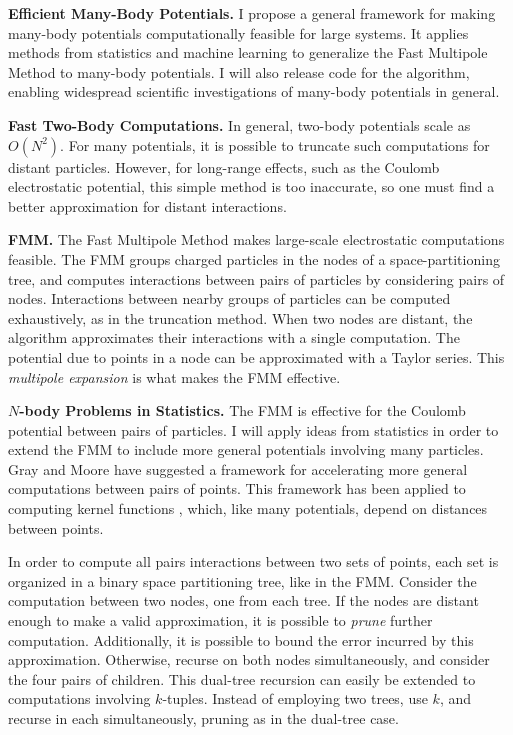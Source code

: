 \documentclass[twoside,leqno, 12pt]{article}
\begin{document}
\textbf{Efficient Many-Body Potentials.}  I propose a general framework for making many-body potentials computationally feasible for large systems.  It applies methods from statistics and machine learning to generalize the Fast Multipole Method to many-body potentials.  I will also release code for the algorithm, enabling widespread scientific investigations of many-body potentials in general.


\textbf{Fast Two-Body Computations.}  In general, two-body potentials scale as $O(N^2)$.  For many potentials, it is possible to truncate such computations for distant particles.  However, for long-range effects, such as the Coulomb electrostatic potential, this simple method is too inaccurate, so one must find a better approximation for distant interactions.  

\textbf{FMM.}  The Fast Multipole Method \cite{grngard} makes large-scale electrostatic computations feasible.  The FMM groups charged particles in the nodes of a space-partitioning tree, and computes interactions between pairs of particles by considering pairs of nodes.  Interactions between nearby groups of particles can be computed exhaustively, as in the truncation method.  When two nodes are distant, the algorithm approximates their interactions with a single computation.  The potential due to points in a node can be approximated with a Taylor series.  This \emph{multipole expansion} is what makes the FMM effective.


\textbf{$N$-body Problems in Statistics.}  The FMM is effective for the Coulomb potential between pairs of particles.  I will apply ideas from statistics in order to extend the FMM to include more general potentials involving many particles.  Gray and Moore \cite{gray_nbody} have suggested a framework for accelerating more general computations between pairs of points.  This framework has been applied to computing kernel functions \cite{NIPS2005_570}, which, like many potentials, depend on distances between points.

In order to compute all pairs interactions between two sets of points, each set is organized in a binary space partitioning tree, like in the FMM.  Consider the computation between two nodes, one from each tree.  If the nodes are distant enough to make a valid approximation, it is possible to \emph{prune} further computation.  Additionally, it is possible to bound the error incurred by this approximation.  Otherwise, recurse on both nodes simultaneously, and consider the four pairs of children.  This dual-tree recursion can easily be extended to computations involving $k$-tuples.  Instead of employing two trees,  use $k$, and recurse in each simultaneously, pruning as in the dual-tree case. 
\end{document}
